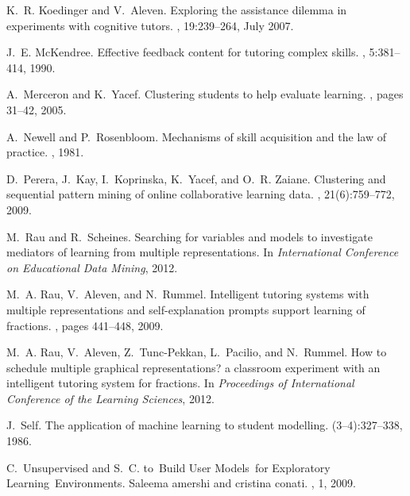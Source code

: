 \documentclass{edm_template}
\begin{document}
\begin{thebibliography}{10}
K.~R. Koedinger and V.~Aleven.
\newblock Exploring the assistance dilemma in experiments with cognitive
  tutors.
, 19:239--264, July 2007.

J.~E. McKendree.
\newblock Effective feedback content for tutoring complex skills.
, 5:381--414, 1990.

A.~Merceron and K.~Yacef.
\newblock Clustering students to help evaluate learning.
, pages 31--42, 2005.

A.~Newell and P.~Rosenbloom.
\newblock Mechanisms of skill acquisition and the law of practice.
, 1981.

D.~Perera, J.~Kay, I.~Koprinska, K.~Yacef, and O.~R. Zaiane.
\newblock Clustering and sequential pattern mining of online collaborative
  learning data.
,
  21(6):759--772, 2009.

M.~Rau and R.~Scheines.
\newblock Searching for variables and models to investigate mediators of
  learning from multiple representations.
\newblock In {\em International Conference on Educational Data Mining}, 2012.

M.~A. Rau, V.~Aleven, and N.~Rummel.
\newblock Intelligent tutoring systems with multiple representations and
  self-explanation prompts support learning of fractions.
, pages 441--448, 2009.

M.~A. Rau, V.~Aleven, Z.~Tunc-Pekkan, L.~Pacilio, and N.~Rummel.
\newblock How to schedule multiple graphical representations? a classroom
  experiment with an intelligent tutoring system for fractions.
\newblock In {\em Proceedings of International Conference of the Learning
  Sciences}, 2012.

J.~Self.
\newblock The application of machine learning to student modelling.
(3--4):327--338, 1986.

C.~Unsupervised and S.~C. to~Build User Models~for Exploratory
  Learning~Environments.
\newblock Saleema amershi and cristina conati.
, 1, 2009.

\end{thebibliography}

\balancecolumns
\end{document}

